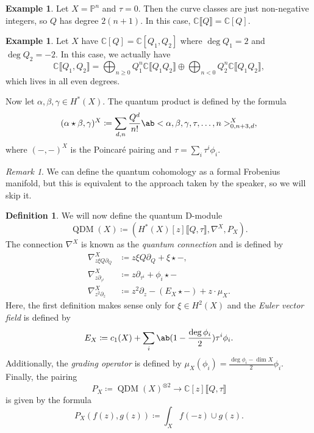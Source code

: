 \documentclass{amsart}
\theoremstyle{definition}
\newtheorem{defn}[thm]{Definition}
\newtheorem{exm}[thm]{Example}
\theoremstyle{remark}
\newtheorem{rmk}[thm]{Remark}
\theoremstyle{plain}
\theoremstyle{definition}
\theoremstyle{remark}
\newcommand{\C}{\mathbb{C}}
\renewcommand{\P}{\mathbb{P}}
\newcommand{\on}[1]{\operatorname{#1}}
\newcommand{\1}{\mathbf{1}}
\newcommand{\2}{\mathbf{2}}
\newcommand{\3}{\mathbf{3}}
\newcommand{\ps}[1]{\lBrack #1 \rBrack}
\begin{document}
\begin{exm}
    Let \(X = \P^n\) and \(\tau = 0\). Then the curve classes are just non-negative integers, so \(Q\) has degree \(2(n+1)\). In this case, \(\C\ps{Q} = \C[Q]\).
\end{exm}

\begin{exm}
    Let \(X\) have \(\C[Q] = \C[Q_1, Q_2]\) where \(\deg Q_1 = 2\) and \(\deg Q_2 = -2\). In this case, we actually have
    \[ \C\ps{Q_1, Q_2} = \bigoplus_{n \geq 0} Q_1^n \C\ps{Q_1 Q_2} \oplus \bigoplus_{n<0} Q_2^n \C\ps{Q_1 Q_2}, \]
    which lives in all even degrees.
\end{exm}

Now let \(\alpha, \beta, \gamma \in H^*(X)\). The quantum product is defined by the formula
\[ (\alpha \star \beta, \gamma)^X \coloneqq \sum_{d, n} \frac{Q^d}{n!} \ab<\alpha, \beta, \gamma, \tau, \ldots, n>_{0, n+3, d}^X, \]
where \((-,-)^X\) is the Poincar\'e pairing and \(\tau = \sum_i \tau^i \phi_i\).

\begin{rmk}
    We can define the quantum cohomology as a formal Frobenius manifold, but this is equivalent to the approach taken by the speaker, so we will skip it.
\end{rmk}

\begin{defn}
    We will now define the quantum D-module
    \[ \on{QDM}(X) \coloneqq (H^*(X)[z]\ps{Q, \tau}, \nabla^X, P_X). \]
    The connection \(\nabla^X\) is known as the \textit{quantum connection} and is defined by
    \begin{align*}
        \nabla_{z \xi Q \partial_Q}^X &\coloneqq z \xi Q \partial_Q + \xi \star -, \\
        \nabla_{z \partial_{\tau^i}}^X &\coloneqq z \partial_{\tau^i} + \phi_i \star - \\
        \nabla_{z^2 \partial_z}^X &\coloneqq z^2 \partial_z - (E_X \star -) + z \cdot \mu_X.
    \end{align*}
    Here, the first definition makes sense only for \(\xi \in H^2(X)\) and the \textit{Euler vector field} is defined by
    \[ E_X \coloneqq c_1(X) + \sum_i \ab(1 - \frac{\deg \phi_i}{2}) \tau^i \phi_i. \]
    Additionally, the \textit{grading operator} is defined by \(\mu_X (\phi_i) = \frac{\deg \phi_i - \dim X}{2} \phi_i\). Finally, the pairing
    \[ P_X \coloneqq \on{QDM}(X)^{\otimes 2} \to \C[z] \ps{Q, \tau} \]
    is given by the formula
    \[ P_X (f(z), g(z)) \coloneqq \int_X f(-z) \cup g(z). \]
\end{defn}
\end{document}
